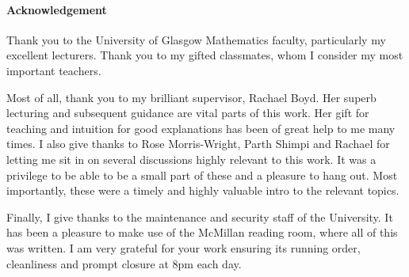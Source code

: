 \documentclass[class=article, crop=false]{standalone}
\begin{document}
\paragraph{Acknowledgement}
Thank you to the University of Glasgow Mathematics faculty, particularly my excellent lecturers. Thank you to my gifted classmates, whom I consider my most important teachers.

Most of all, thank you to my brilliant supervisor, Rachael Boyd. Her superb lecturing and subsequent guidance are vital parts of this work. Her gift for teaching and intuition for good explanations has been of great help to me many times. I also give thanks to Rose Morris-Wright, Parth Shimpi and Rachael for letting me sit in on several discussions highly relevant to this work. It was a privilege to be able to be a small part of these and a pleasure to hang out. Most importantly, these were a timely and highly valuable intro to the relevant topics.

Finally, I give thanks to the maintenance and security staff of the University. It has been a pleasure to make use of the McMillan reading room, where all of this was written. I am very grateful for your work ensuring its running order, cleanliness and prompt closure at 8pm each day.
\end{document}
